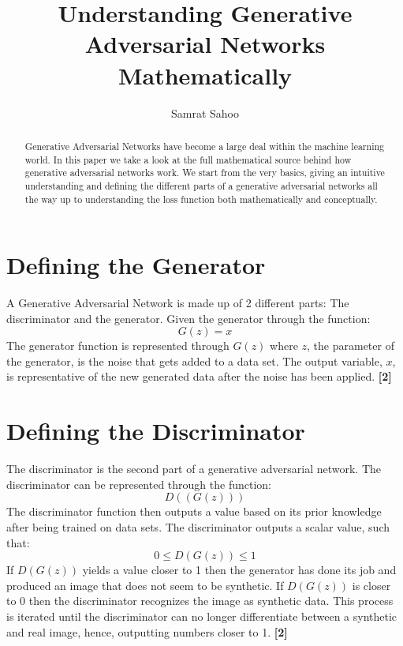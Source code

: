\documentclass{cup-pan}
\title{Understanding Generative Adversarial Networks Mathematically}
\author[ ]{Samrat Sahoo}
\affil[ ]{UT Arlington}
\affil[ ]{Advisor: Professor Won Hwa Kim}
\affil[ ]{Email: \url{won.kim@uta.edu}}
\begin{document}
\maketitle
 
\begin{abstract}
Generative Adversarial Networks have become a large deal within the machine learning world. In this paper we take a look at the full mathematical source behind how generative adversarial networks work. We start from the very basics, giving an intuitive understanding and defining the different parts of a generative adversarial networks all the way up to understanding the loss function both mathematically and conceptually.

\end{abstract}

\section{Defining the Generator}
\label{sec:overview}
A Generative Adversarial Network is made up of 2 different parts: The discriminator and the generator. Given the generator through the function: 
\begin{equation}
G(z) = x
\end{equation}
The generator function is represented through $G(z)$ where $z$, the parameter of the generator, is the noise that gets added to a data set. The output variable, $x$, is representative of the new generated data after the noise has been applied. \textbf{[2]}
\section{Defining the Discriminator}
\label{sec:overview}
The discriminator is the second part of a generative adversarial network. The discriminator can be represented through the function: 
\begin{equation}
D((G(z)))
\end{equation}
The discriminator function then outputs a value based on its prior knowledge after being trained on data sets. The discriminator outputs a scalar value, such that:
\begin{equation}
0 \leq D(G(z)) \leq 1
\end{equation}
If $D(G(z))$ yields a value closer to 1 then the generator has done its job and produced an image that does not seem to be synthetic. If $D(G(z))$ is closer to 0 then the discriminator recognizes the image as synthetic data. This process is iterated until the discriminator can no longer differentiate between a synthetic and real image, hence, outputting numbers closer to 1. \textbf{[2]}
\end{document}
